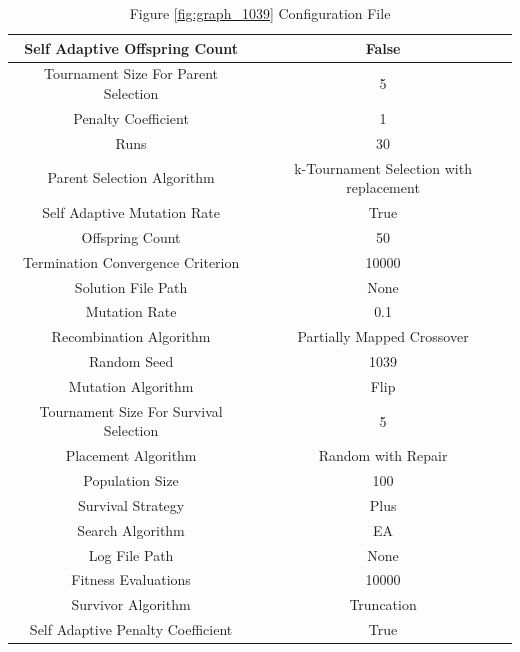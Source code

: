 \documentclass{standalone}
\begin{document}
\begin{table}[!htb]
	\centering
	\caption{Figure \ref{fig:graph_1039} Configuration File}
	\label{tab:graph_1039}
	\begin{tabular}{| c | c |}
		\hline
		Self Adaptive Offspring Count		& False		 \\
		\hline
		Tournament Size For Parent Selection		& 5		 \\
		\hline
		Penalty Coefficient		& 1		 \\
		\hline
		Runs		& 30		 \\
		\hline
		Parent Selection Algorithm		& k-Tournament Selection with replacement		 \\
		\hline
		Self Adaptive Mutation Rate		& True		 \\
		\hline
		Offspring Count		& 50		 \\
		\hline
		Termination Convergence Criterion		& 10000		 \\
		\hline
		Solution File Path		& None		 \\
		\hline
		Mutation Rate		& 0.1		 \\
		\hline
		Recombination Algorithm		& Partially Mapped Crossover		 \\
		\hline
		Random Seed		& 1039		 \\
		\hline
		Mutation Algorithm		& Flip		 \\
		\hline
		Tournament Size For Survival Selection		& 5		 \\
		\hline
		Placement Algorithm		& Random with Repair		 \\
		\hline
		Population Size		& 100		 \\
		\hline
		Survival Strategy		& Plus		 \\
		\hline
		Search Algorithm		& EA		 \\
		\hline
		Log File Path		& None		 \\
		\hline
		Fitness Evaluations		& 10000		 \\
		\hline
		Survivor Algorithm		& Truncation		 \\
		\hline
		Self Adaptive Penalty Coefficient		& True		 \\
		\hline
	\end{tabular}
\end{table}
\end{document}
